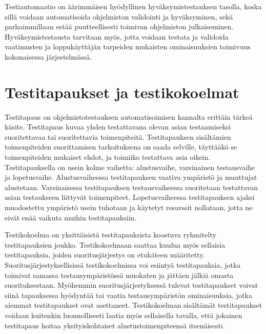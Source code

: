     Testiautomaatio on äärimmäisen hyödyllinen hyväksymistestauksen tasolla, koska sillä voidaan automatisoida ohjelmiston validointi ja hyväksyminen, sekä parhaimmillaan estää puutteellisesti toimivan ohjelmiston julkaiseminen.
    Hyväksymistestausta tarvitaan myös, jotta voidaan testata ja validoida vaatimusten ja loppukäyttäjän tarpeiden mukaisten ominaisuuksien toimivuus kokonaisessa järjestelmässä.

\section{Testitapaukset ja testikokoelmat} \label{ch:07_testitapaukset_ja_testikokoelmat}

  Testitapaus on ohjelmistotestauksen automatisoimisen kannalta erittäin tärkeä käsite.
  Testitapaus kuvaa yhden testattavana olevan asian testaamiseksi suoritettavaa tai suoritettavia toimenpiteitä.
  Testitapauksen sisältämien toimenpiteiden suorittamisen tarkoituksena on saada selville, täyttääkö se toimenpiteiden mukaiset ehdot, ja toimiiko testattava asia oikein.
  Testitapauksella on usein kolme vaihetta: alustusvaihe, varsinainen testausvaihe ja lopetusvaihe.
  Alustusvaiheessa testitapauksen vaativa ympäristö ja muuttujat alustetaan.
  Varsinaisessa testitapauksen testausvaiheessa suoritetaan testattavan asian testaukseen liittyvät toimenpiteet.
  Lopetusvaiheessa testitapauksen ajaksi muodostettu ympäristö usein tuhotaan ja käytetyt resurssit nollataan, jotta ne eivät enää vaikuta muihin testitapauksiin.

  Testikokoelma on yksittäisistä testitapauksista koostuva ryhmitelty testitapauksien joukko.
  Testikokoelmaan saattaa kuulua myös sellaisia testitapauksia, joiden suoritusjärjestys on etukäteen määritetty.
  Suoritusjärjestyksellisissä testikokoelmissa voi esiintyä testitapauksia, jotka toimivat samassa testausympäristössä muokaten ja jättäen jälkiä omasta suorituksestaan.
  Myöhemmin suoritusjärjestyksessä tulevat testitapaukset voivat siinä tapauksessa hyödyntää tai vaatia testausympäristön ominaisuuksia, jotka aiemmat testitapaukset ovat asettaneet.
  Testikokoelman sisältämät testitapaukset voidaan kuitenkin luonnollisesti laatia myös sellaisella tavalla, että jokainen testitapaus hoitaa yksityiskohtaiset alustustoimenpiteensä itsenäisesti.

